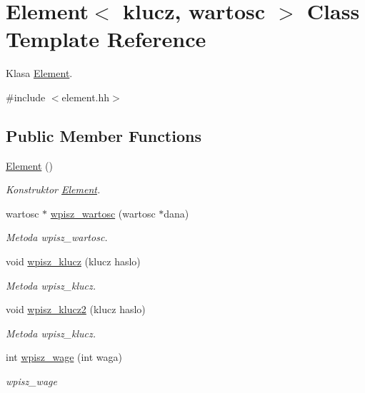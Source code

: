 \hypertarget{class_element}{\section{Element$<$ klucz, wartosc $>$ Class Template Reference}
\label{class_element}
}


Klasa \hyperlink{class_element}{Element}.  




{\ttfamily \#include $<$element.\+hh$>$}

\subsection*{Public Member Functions}
\begin{DoxyCompactItemize}
\item 
\hyperlink{class_element_a2908ce7965da27acf29ba7a8ed702a9e}{Element} ()
\begin{DoxyCompactList}\small\item\em Konstruktor \hyperlink{class_element}{Element}. \end{DoxyCompactList}\item 
wartosc $\ast$ \hyperlink{class_element_a95e99b08207e2eee854855a3cf624ee8}{wpisz\+\_\+wartosc} (wartosc $\ast$dana)
\begin{DoxyCompactList}\small\item\em Metoda wpisz\+\_\+wartosc. \end{DoxyCompactList}\item 
void \hyperlink{class_element_aab83ecbc43e50357b34839a7836f7f00}{wpisz\+\_\+klucz} (klucz haslo)
\begin{DoxyCompactList}\small\item\em Metoda wpisz\+\_\+klucz. \end{DoxyCompactList}\item 
void \hyperlink{class_element_aea3e8d9929eaf9921ba3e805ccae9d3c}{wpisz\+\_\+klucz2} (klucz haslo)
\begin{DoxyCompactList}\small\item\em Metoda wpisz\+\_\+klucz. \end{DoxyCompactList}\item 
int \hyperlink{class_element_afb6bb7f1f9c6a127b66bd8a49f83f1dc}{wpisz\+\_\+wage} (int waga)
\begin{DoxyCompactList}\small\item\em wpisz\+\_\+wage \end{DoxyCompactList}\item 

\end{DoxyCompactItemize}
